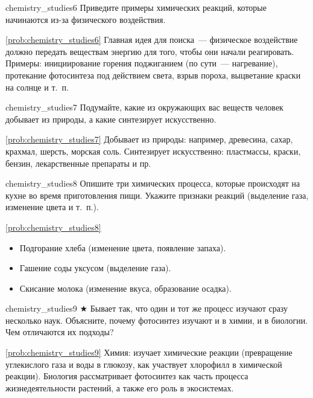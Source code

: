 \begin{problem}{}{chemistry_studies6}
    Приведите примеры химических реакций, которые начинаются из-за физического воздействия.

    \begin{sol}{\ref{prob:chemistry_studies6}}
        Главная идея для поиска~--- физическое воздействие должно передать веществам энергию для того, чтобы они начали реагировать. Примеры: инициирование горения поджиганием (по сути~--- нагревание), протекание фотосинтеза под действием света, взрыв пороха, выцветание краски на солнце и т.~п.
    \end{sol}
\end{problem}

\begin{problem}{}{chemistry_studies7}
    Подумайте, какие из окружающих вас веществ человек добывает из природы, а какие синтезирует искусственно.

    \begin{sol}{\ref{prob:chemistry_studies7}}
        Добывает из природы: например, древесина, сахар, крахмал, шерсть, морская соль. Синтезирует искусственно: пластмассы, краски, бензин, лекарственные препараты и пр.
    \end{sol}
\end{problem}

\begin{problem}{}{chemistry_studies8}
    Опишите три химических процесса, которые происходят на кухне во время приготовления пищи. Укажите признаки реакций (выделение газа, изменение цвета и т.~п.).

    \begin{sol}{\ref{prob:chemistry_studies8}}
        \begin{itemize}
            \item Подгорание хлеба (изменение цвета, появление запаха).
            \item Гашение соды уксусом (выделение газа).
            \item Скисание молока (изменение вкуса, образование осадка).
        \end{itemize}
    \end{sol}
\end{problem}

\begin{problem}{}{chemistry_studies9}
    $\bigstar$ Бывает так, что один и тот же процесс изучают сразу несколько наук. Объясните, почему фотосинтез изучают и в химии, и в биологии. Чем отличаются их подходы?

    \begin{sol}{\ref{prob:chemistry_studies9}}
        Химия: изучает химические реакции (превращение углекислого газа и воды в глюкозу, как участвует хлорофилл в химической реакции). Биология рассматривает фотосинтез как часть процесса жизнедеятельности растений, а также его роль в экосистемах.
    \end{sol}
\end{problem}

